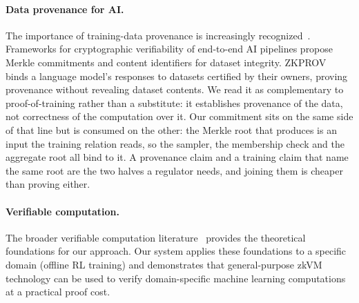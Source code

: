 \paragraph{Data provenance for AI.}
The importance of training-data provenance is increasingly
recognized~\cite{dataauth2024, aiprovenance2025}. Frameworks for cryptographic
verifiability of end-to-end AI pipelines propose Merkle commitments and content
identifiers for dataset integrity. ZKPROV~\cite{zkprov2025} binds a language
model's responses to datasets certified by their owners, proving provenance
without revealing dataset contents. We read it as complementary to
proof-of-training rather than a substitute: it establishes provenance of the
data, not correctness of the computation over it. Our commitment sits on the same side of
that line but is consumed on the other: the Merkle root that
 produces is an input the training relation reads,
so the sampler, the membership check and the aggregate root all bind to it. A
provenance claim and a training claim that name the same root are the two
halves a regulator needs, and joining them is cheaper than proving either.

\paragraph{Verifiable computation.}
The broader verifiable computation literature~\cite{walfish2015verifiable}
provides the theoretical foundations for our approach. Our system applies these
foundations to a specific domain (offline RL training) and demonstrates that
general-purpose zkVM technology can be used to verify domain-specific machine
learning computations at a practical proof cost.
